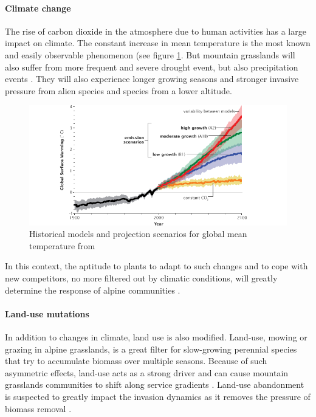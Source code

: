 \paragraph{Climate change}

The rise of carbon dioxide in the atmosphere due to human activities has a large impact on climate. The constant increase in mean temperature is the most known and easily observable phenomenon (see figure \ref{fig:climate}. But mountain grasslands will also suffer from more frequent and severe drought event, but also precipitation events \parencite{beniston_climate_1997, solomon_climate_2007, intergovernmental_panel_on_climate_change_climate_2014}. They will also experience longer growing seasons and stronger invasive pressure from alien species and species from a lower altitude.


\begin{figure}
    \includegraphics[width=1\linewidth]{./1_Introduction/graphics/ipcc_scenarios.png}
  \caption[IPCC scenarios for global mean temperature]{Historical models and projection scenarios for global mean temperature from \cite{solomon_climate_2007} }
  \label{fig:climate}
\end{figure}

In this context, the aptitude to plants to adapt to such changes and to cope with new competitors, no more filtered out by climatic conditions, will greatly determine the response of alpine communities \parencite{alexander_novel_2015}.

\paragraph{Land-use mutations}

In addition to changes in climate, land use is also modified.  Land-use, mowing or grazing in alpine grasslands, is a great filter for slow-growing perennial species that try to accumulate biomass over multiple seasons. Because of such asymmetric effects, land-use acts as a strong driver and can cause mountain grasslands communities to shift along service gradients \parencite{schirpke_multiple_2012}. Land-use abandonment is suspected to greatly impact the invasion dynamics as it removes the pressure of biomass removal \parencite{carboni_simulating_2017}. 

